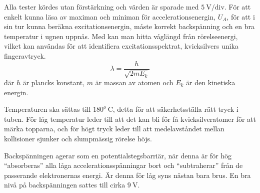 Alla tester kördes utan förstärkning och värden är sparade med $5~\textrm{V/div.}$
För att enkelt kunna läsa av maximan och miniman för accelerationsenergin, $U_A$, för att i sin tur kunna beräkna excitationsenergin, måste korrekt backspänning och en bra temperatur i ugnen uppnås. Med \cite[s. 303]{ph} kan man hitta våglängd från rörelseenergi, vilket kan användas för att identifiera excitationsspektrat, kvicksilvers unika fingeravtryck.
\begin{equation}\label{eq:debrog}
	\lambda = \frac{h}{\sqrt{2mE_k}}
\end{equation}
där $h$ är plancks konstant, $m$ är massan av atomen och $E_k$ är den kinetiska energin.

Temperaturen ska sättas till $180^o~\textrm{C}$, detta för att säkerhetsställa rätt tryck i tuben. För låg temperatur leder till att det kan bli för få kvicksilveratomer för att märka topparna, och för högt tryck leder till att medelavståndet mellan kollisioner sjunker och slumpmässig rörelse höjs\cite{rochhand}.

Backspänningen agerar som en potentialstegsbarriär, när denna är för hög ``absorberas'' alla låga accelerationsspänningar bort och ``subtraherar'' från de passerande elektronernas energi. Är denna för låg syns nästan bara brus.
En bra nivå på backspänningen sattes till cirka $9~\textrm{V}$.